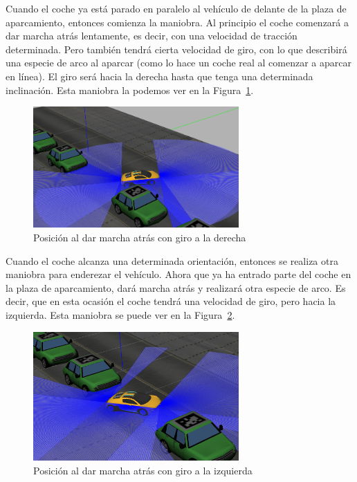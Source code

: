 Cuando el coche ya está parado en paralelo al vehículo de delante de la plaza de aparcamiento, entonces comienza la maniobra. Al principio el coche comenzará a dar marcha atrás lentamente, es decir, con una velocidad de tracción determinada. Pero también tendrá cierta velocidad de giro, con lo que describirá una especie de arco al aparcar (como lo hace un coche real al comenzar a aparcar en línea). El giro será hacia la derecha hasta que tenga una determinada inclinación. Esta maniobra la podemos ver en la Figura~\ref{fig.Posicion3}.

\begin{figure}[H]
  \begin{center}
    \includegraphics[width=0.7\textwidth]{figures/Autopark/Posicion3.png}
		\caption{Posición al dar marcha atrás con giro a la derecha}
		\label{fig.Posicion3}
		\end{center}
\end{figure}

Cuando el coche alcanza una determinada orientación, entonces se realiza otra maniobra para enderezar el vehículo. Ahora que ya ha entrado parte del coche en la plaza de aparcamiento, dará marcha atrás y realizará otra especie de arco. Es decir, que en esta ocasión el coche tendrá una velocidad de giro, pero hacia la izquierda. Esta maniobra se puede ver en la Figura~\ref{fig.Posicion4}.

\begin{figure}[H]
  \begin{center}
    \includegraphics[width=0.7\textwidth]{figures/Autopark/Posicion4.png}
		\caption{Posición al dar marcha atrás con giro a la izquierda}
		\label{fig.Posicion4}
		\end{center}
\end{figure}

